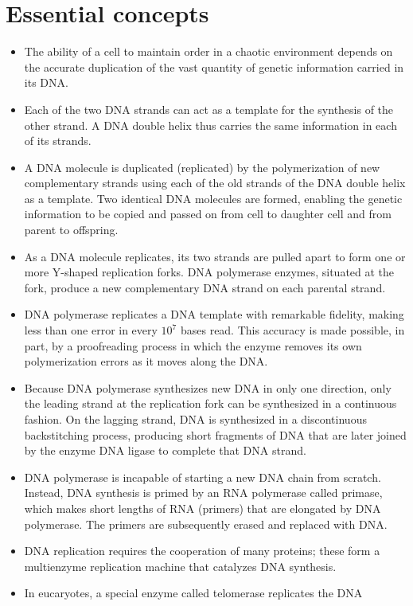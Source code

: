\section{Essential concepts}

\begin{itemize}
\item The ability of a cell to maintain order in a chaotic environment
depends on the accurate duplication of the vast quantity of genetic
information carried in its DNA.
\item Each of the two DNA strands can act as a template for the synthesis
of the other strand. A DNA double helix thus carries the same information
in each of its strands.
\item A DNA molecule is duplicated (replicated) by the polymerization of
new complementary strands using each of the old strands of the DNA
double helix as a template. Two identical DNA molecules are formed,
enabling the genetic information to be copied and passed on from
cell to daughter cell and from parent to offspring.
\item As a DNA molecule replicates, its two strands are pulled apart to form
one or more Y-shaped replication forks. DNA polymerase enzymes,
situated at the fork, produce a new complementary DNA strand on
each parental strand.
\item DNA polymerase replicates a DNA template with remarkable fidelity,
making less than one error in every $10^7$ bases read. This accuracy
is made possible, in part, by a proofreading process in which the
enzyme removes its own polymerization errors as it moves along the
DNA.
\item Because DNA polymerase synthesizes new DNA in only one direction,
only the leading strand at the replication fork can be synthesized in
a continuous fashion. On the lagging strand, DNA is synthesized in
a discontinuous backstitching process, producing short fragments of
DNA that are later joined by the enzyme DNA ligase to complete that
DNA strand.
\item DNA polymerase is incapable of starting a new DNA chain from
scratch. Instead, DNA synthesis is primed by an RNA polymerase
called primase, which makes short lengths of RNA (primers) that are
elongated by DNA polymerase. The primers are subsequently erased
and replaced with DNA.
\item DNA replication requires the cooperation of many proteins; these form
a multienzyme replication machine that catalyzes DNA synthesis.
\item In eucaryotes, a special enzyme called telomerase replicates the DNA

\end{itemize}
